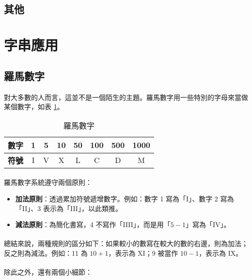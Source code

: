 \documentclass[12pt,a4paper,oneside]{report}
\begin{document}
\begin{CJK}{UTF8}{bkai}
\subsection{其他}


\section{字串應用}
\subsection{羅馬數字}

\paragraph{}對大多數的人而言，這並不是一個陌生的主題。羅馬數字用一些特別的字母來當做某個數字，如表 \ref{string:mani:table:roman:number}。

\begin{table}[h!]
  \centering
  \begin{tabular}{|c||c|c|c|c|c|c|c|}
  \hline
  \textbf{數字} & 1 & 5 & 10 & 50 & 100 & 500 & 1000\\
  \hline
  \textbf{符號} & I & V & X & L & C & D & M\\
  \hline
  \end{tabular}
  \caption{羅馬數字}
  \label{string:mani:table:roman:number}
\end{table}

\paragraph{}羅馬數字系統遵守兩個原則：

\begin{itemize}
\item \textbf{加法原則}：透過累加符號遞增數字。例如：數字 1 寫為「I」、數字 2 寫為「II」、3 表示為「III」，以此類推。
\item \textbf{減法原則}：為簡化書寫，4 不寫作「IIII」，而是用「$5-1$」寫為「IV」。
\end{itemize}

\paragraph{}總結來說，兩種規則的區分如下：如果較小的數寫在較大的數的右邊，則為加法；反之則為減法。例如：11 為 $10+1$，表示為 XI；9 被當作 $10-1$，表示為 IX。
\paragraph{}除此之外，還有兩個小細節：


\end{CJK}
\end{document}
